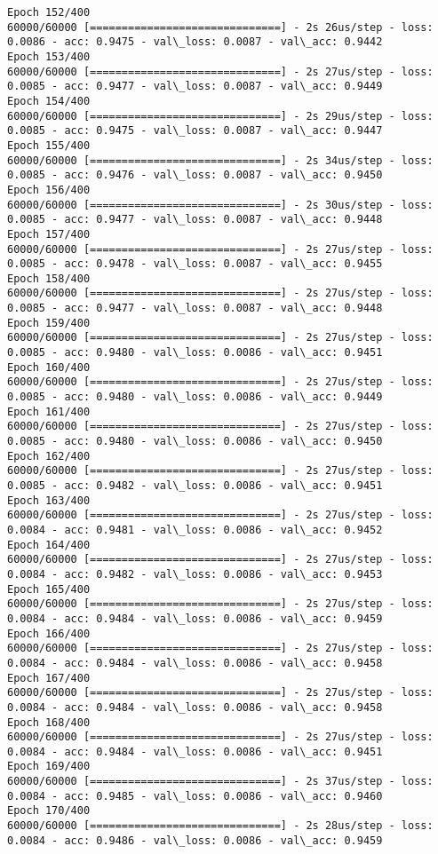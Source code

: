 \documentclass[11pt]{article}
\begin{document}
\begin{Verbatim}[commandchars=\\\{\}]
Epoch 152/400
60000/60000 [==============================] - 2s 26us/step - loss: 0.0086 - acc: 0.9475 - val\_loss: 0.0087 - val\_acc: 0.9442
Epoch 153/400
60000/60000 [==============================] - 2s 27us/step - loss: 0.0085 - acc: 0.9477 - val\_loss: 0.0087 - val\_acc: 0.9449
Epoch 154/400
60000/60000 [==============================] - 2s 29us/step - loss: 0.0085 - acc: 0.9475 - val\_loss: 0.0087 - val\_acc: 0.9447
Epoch 155/400
60000/60000 [==============================] - 2s 34us/step - loss: 0.0085 - acc: 0.9476 - val\_loss: 0.0087 - val\_acc: 0.9450
Epoch 156/400
60000/60000 [==============================] - 2s 30us/step - loss: 0.0085 - acc: 0.9477 - val\_loss: 0.0087 - val\_acc: 0.9448
Epoch 157/400
60000/60000 [==============================] - 2s 27us/step - loss: 0.0085 - acc: 0.9478 - val\_loss: 0.0087 - val\_acc: 0.9455
Epoch 158/400
60000/60000 [==============================] - 2s 27us/step - loss: 0.0085 - acc: 0.9477 - val\_loss: 0.0087 - val\_acc: 0.9448
Epoch 159/400
60000/60000 [==============================] - 2s 27us/step - loss: 0.0085 - acc: 0.9480 - val\_loss: 0.0086 - val\_acc: 0.9451
Epoch 160/400
60000/60000 [==============================] - 2s 27us/step - loss: 0.0085 - acc: 0.9480 - val\_loss: 0.0086 - val\_acc: 0.9449
Epoch 161/400
60000/60000 [==============================] - 2s 27us/step - loss: 0.0085 - acc: 0.9480 - val\_loss: 0.0086 - val\_acc: 0.9450
Epoch 162/400
60000/60000 [==============================] - 2s 27us/step - loss: 0.0085 - acc: 0.9482 - val\_loss: 0.0086 - val\_acc: 0.9451
Epoch 163/400
60000/60000 [==============================] - 2s 27us/step - loss: 0.0084 - acc: 0.9481 - val\_loss: 0.0086 - val\_acc: 0.9452
Epoch 164/400
60000/60000 [==============================] - 2s 27us/step - loss: 0.0084 - acc: 0.9482 - val\_loss: 0.0086 - val\_acc: 0.9453
Epoch 165/400
60000/60000 [==============================] - 2s 27us/step - loss: 0.0084 - acc: 0.9484 - val\_loss: 0.0086 - val\_acc: 0.9459
Epoch 166/400
60000/60000 [==============================] - 2s 27us/step - loss: 0.0084 - acc: 0.9484 - val\_loss: 0.0086 - val\_acc: 0.9458
Epoch 167/400
60000/60000 [==============================] - 2s 27us/step - loss: 0.0084 - acc: 0.9484 - val\_loss: 0.0086 - val\_acc: 0.9458
Epoch 168/400
60000/60000 [==============================] - 2s 27us/step - loss: 0.0084 - acc: 0.9484 - val\_loss: 0.0086 - val\_acc: 0.9451
Epoch 169/400
60000/60000 [==============================] - 2s 37us/step - loss: 0.0084 - acc: 0.9485 - val\_loss: 0.0086 - val\_acc: 0.9460
Epoch 170/400
60000/60000 [==============================] - 2s 28us/step - loss: 0.0084 - acc: 0.9486 - val\_loss: 0.0086 - val\_acc: 0.9459

\end{Verbatim}
\end{document}
